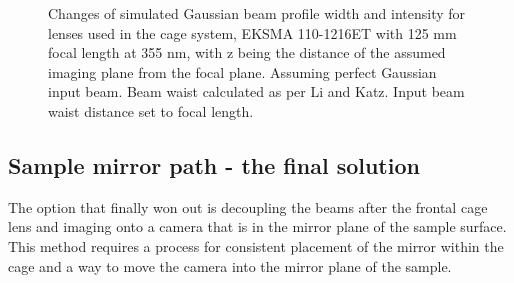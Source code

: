 \documentclass[twoside,openright,listof=numbered]{scrreprt}
\begin{document}
\begin{figure}[htbp]
\begin{subfigure}[t]{\textwidth}
\end{subfigure}
\caption[Changes of simulated Gaussian beam profile width and intensity for lenses used in the cage system.]{Changes of simulated Gaussian beam profile width and intensity for lenses used in the cage system, EKSMA 110-1216ET with 125 mm focal length at 355 nm, with z being the distance of the assumed imaging plane from the focal plane.  Assuming perfect Gaussian input beam. Beam waist calculated as per Li and Katz\cite{Li1994}. Input beam waist distance set to focal length. \label{fig:beamWaistCompendium}}
\end{figure}

\subsection{Sample mirror path - the final solution}\label{SampleMirrorCamera}
The option that finally won out is decoupling the beams after the frontal cage lens and imaging onto a camera that is in the mirror plane of the sample surface. This method requires a process for consistent placement of the mirror within the cage and a way to move the camera into the mirror plane of the sample.\\
\end{document}
